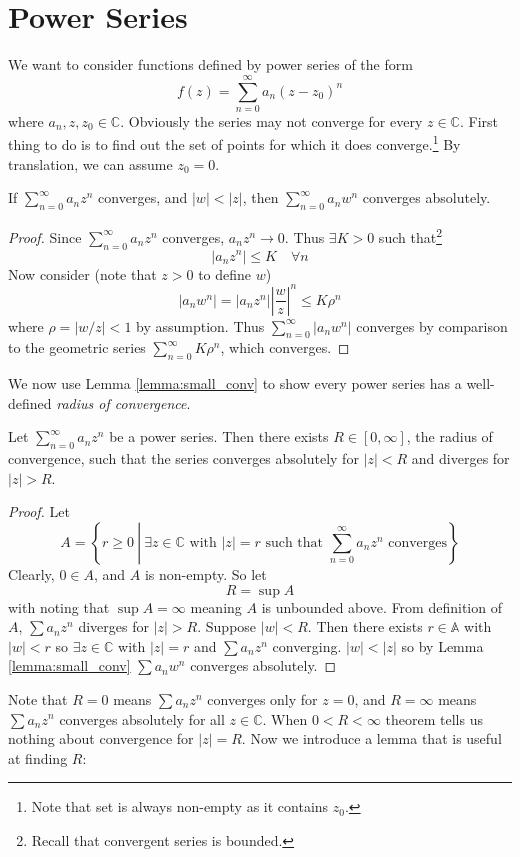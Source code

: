 \documentclass[10pt, a4paper, twoside]{report}
\begin{document}
\section{Power Series}
We want to consider functions defined by power series of the form 
\[f(z)=\sum_{n=0}^{\infty}a_n(z-z_0)^n\]
where \(a_n,z,z_0\in\mathbb{C}\). Obviously the series may not converge for every \(z\in\mathbb{C}\). First thing to do is to find out the set of points for which it does converge.\footnote{Note that set is always non-empty as it contains \(z_0\).} By translation, we can assume \(z_0=0\). 
\begin{lemma}
    If \(\sum_{n=0}^\infty a_nz^n\) converges, and \(|w|<|z|\), then \(\sum_{n=0}^\infty a_nw^n\) converges absolutely.
    \label{lemma:small_conv}
\end{lemma}
\begin{proof}
    Since \(\sum_{n=0}^\infty a_nz^n\) converges, \(a_nz^n\to 0\). Thus \(\exists K>0\) such that\footnote{Recall that convergent series is bounded.} 
    \[|a_nz^n|\leq K\quad\forall n\]
    Now consider (note that \(z>0\) to define \(w\))
    \[|a_nw^n|=|a_nz^n|\left|\frac wz\right|^n\leq K\rho^n\]
    where \(\rho=|w/z|<1\) by assumption. Thus \(\sum_{n=0}^\infty |a_nw^n|\) converges by comparison to the geometric series \(\sum_{n=0}^\infty K\rho^n\), which converges.
\end{proof}
We now use Lemma \ref{lemma:small_conv} to show every power series has a well-defined \emph{radius of convergence}.
\begin{theorem}
    Let \(\sum_{n=0}^\infty a_nz^n\) be a power series. Then there exists \(R\in[0,\infty]\), the radius of convergence, such that the series converges absolutely for \(|z|<R\) and diverges for \(|z|>R\).
\end{theorem}
\begin{proof}
    Let
    \[A=\left\{r\geq 0\:\left|\:\exists z\in\mathbb{C}\text{  with  }|z|=r\text{  such that }\sum_{n=0}^\infty a_nz^n\text{  converges}\right.\right\}\]
    Clearly, \(0\in A\), and \(A\) is non-empty. So let 
\[R=\sup A\]
with noting that \(\sup A=\infty\) meaning \(A\) is unbounded above. From definition of \(A\), \(\sum a_nz^n\) diverges for \(|z|>R\). Suppose \(|w|<R\). Then there exists \(r\in\mathbb{A}\) with \(|w|<r\) so \(\exists z\in\mathbb{C}\) with \(|z|=r\) and \(\sum a_nz^n\) converging. \(|w|<|z|\) so by Lemma \ref{lemma:small_conv} \(\sum a_nw^n\) converges absolutely.
\end{proof}
Note that \(R=0\) means \(\sum a_nz^n\) converges only for \(z=0\), and \(R=\infty\) means \(\sum a_nz^n\) converges absolutely for all \(z\in\mathbb{C}\). When \(0<R<\infty\) theorem tells us nothing about convergence for \(|z|=R\). Now we introduce a lemma that is useful at finding \(R\):
\end{document}
